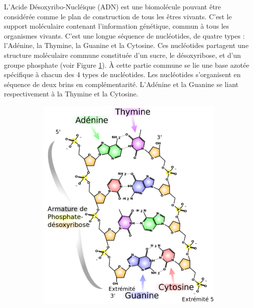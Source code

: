 L'Acide Désoxyribo-Nucléique (ADN) est une biomolécule pouvant être considérée comme le plan de construction de tous les êtres vivants. C'est le support moléculaire contenant l'information génétique, commun à tous les organismes vivants. C'est une longue séquence de nucléotides, de quatre types : l'Adénine, la Thymine, la Guanine et la Cytosine. Ces nucléotides partagent une structure moléculaire commune constituée d'un sucre, le désoxyribose, et d'un groupe phosphate (voir Figure \ref{Fig:dna_structure}). À cette partie commune se lie une base azotée spécifique à chacun des 4 types de nucléotides. Les nucléotides s'organisent en séquence de deux brins en complémentarité. L'Adénine et la Guanine se liant respectivement à la Thymine et la Cytosine.

\begin{figure}
  \begin{subfigure}{.6\textwidth}
  \centering
  {\includegraphics[width=0.75\linewidth]{./figures/ch1/dna_structure}}
    \caption{}
    \label{Fig:dna_structure}
  \end{subfigure}
  \begin{subfigure}{.4\textwidth}
  \centering

\end{subfigure}
\end{figure}
